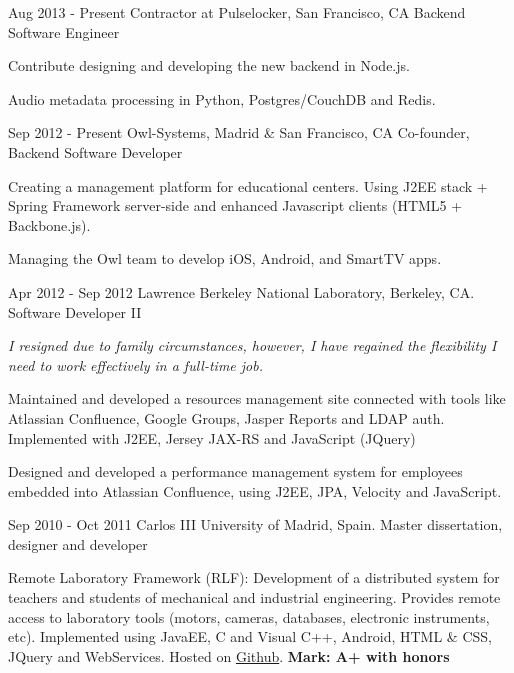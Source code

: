 
\experience
  {Aug 2013 - Present}
  {Contractor at Pulselocker, San Francisco, CA}
  {Backend Software Engineer}
  {\vspace{-1em}\begin{rlist}
    \item Contribute designing and developing the new backend in Node.js.
    \item Audio metadata processing in Python, Postgres/CouchDB and Redis.
  \end{rlist}}

\experience
  {Sep 2012 - Present}
  {Owl-Systems, Madrid \& San Francisco, CA}
  {Co-founder, Backend Software Developer}
  {\vspace{-1em}\begin{rlist}
    \item Creating a management platform for educational centers. Using J2EE stack +
    Spring Framework server-side and enhanced Javascript clients (HTML5 +
    Backbone.js).
    \item Managing the Owl team to develop iOS, Android, and SmartTV apps.
  \end{rlist}}

\experience
  {Apr 2012 - Sep 2012}
  {Lawrence Berkeley National Laboratory, Berkeley, CA.}
  {Software Developer II}
  {\emph{I resigned due to family circumstances, however, I have
    regained the flexibility I need to work effectively in a full-time
    job.}
    \begin{rlist}
    \item Maintained and developed a resources management site
    connected with tools like Atlassian Confluence, Google Groups, Jasper
    Reports and LDAP auth. Implemented with J2EE, Jersey JAX-RS and
    JavaScript (JQuery)
    \item Designed and developed a performance management system for
    employees embedded into Atlassian Confluence, using J2EE, JPA,
    Velocity and JavaScript.
  \end{rlist}}

\experience
  {Sep 2010 - Oct 2011}
  {Carlos III University of Madrid, Spain.}
  {Master dissertation, designer and developer}
  {\vspace{-1em}\begin{rlist}
    \item Remote Laboratory Framework (RLF): Development of a distributed
    system for teachers and students of mechanical and industrial
    engineering. Provides remote access to laboratory tools (motors,
    cameras, databases, electronic instruments, etc).
    Implemented using JavaEE, C and Visual C++,
    Android, HTML \& CSS, JQuery and WebServices. Hosted on \href{https://github.com/CarlosMecha/remote-laboratory-framework}{Github}.
    \textbf{Mark: A+ with honors}
  \end{rlist}}

